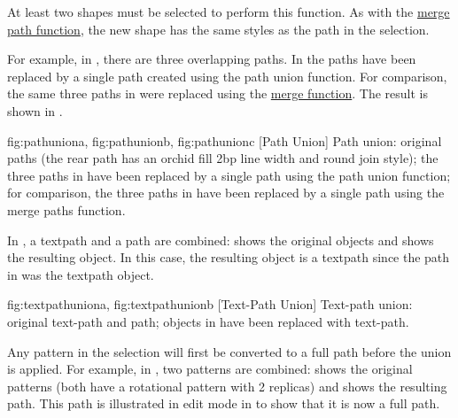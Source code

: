 At least two \glspl*{shape} must be selected to perform this
function. As with the \hyperref[sec:mergepaths]{merge path function}, the
new shape has the same styles as the  path
in the selection.

For example, in , there are three
overlapping paths.  In  the paths have
been replaced by a single path created using the path union
function. For comparison, the same three paths in
 were replaced using the
\hyperref[sec:mergepaths]{merge function}. The result is shown in
.

{
  {fig:pathuniona}{}{},
  {fig:pathunionb}{}{},
  {fig:pathunionc}{}{}
}
[Path Union]
{Path union:
 original paths (the rear path has an
orchid fill  2bp line width and round join style);
 the three paths in
 have been replaced by a single path using
the path union function;
 for comparison, the three paths in
 have been replaced by a single path using
the merge paths function.}

In , a \gls*{textpath} and a
\gls*{path} are combined:  shows
the original objects and  shows
the resulting object. In this case, the resulting object is a
\gls*{textpath} since the  path in
 was the \gls*{textpath} object.

{
  {fig:textpathuniona}{}{},
  {fig:textpathunionb}{}{}
}
[Text-Path Union]
{Text-path union:  original text-path
and path;  objects in
 have been replaced with text-path.}

Any \gls{pattern} in the selection will first be converted to a full
\gls{path} before the union is applied. For example, in
, two patterns are combined:
 shows the original patterns (both have
a rotational pattern with 2 replicas) and
 shows the resulting path. This path is
illustrated in edit mode in  to show
that it is now a full path.

